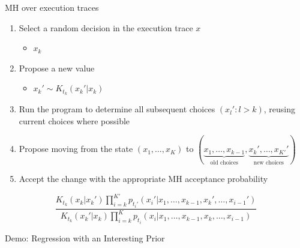 \begin{frame}{MH over execution traces}
  \begin{enumerate}
    \item Select a random decision in the execution trace $x$
    \begin{itemize}
      \item{\eg $x_k$}
    \end{itemize}
    \vspace{\baselineskip}
    \item Propose a new value
    \begin{itemize}
      \item{\eg $x_k' \sim K_{t_k}(x_k'|x_k)$}
    \end{itemize}
    \vspace{\baselineskip}
    \item Run the program to determine all subsequent choices $(x_l' : l > k)$, reusing current choices where possible
    \vspace{\baselineskip}
    \item Propose moving from the state $(x_1,\ldots,x_K)$ to $(\underbrace{x_1,\ldots,x_{k-1}}_{\textrm{old choices}}, \underbrace{x_k',\ldots,x_{K'}'}_{\textrm{new choices}})$
    \vspace{\baselineskip}
    \item Accept the change with the appropriate MH acceptance probability
  \end{enumerate}
  \begin{equation*}
    \frac{K_{t_k}(x_k|x_k')\prod_{i=k}^{K'} p_{t_i'}(x_i'|x_1,\ldots,x_{k-1},x_k',\ldots,x_{i-1}')}{K_{t_k}(x_k'|x_k)\prod_{i=k}^K p_{t_i}(x_i|x_1,\ldots,x_{k-1},x_k,\ldots,x_{i-1})}
  \end{equation*}
\end{frame}


\begin{frame}{Demo: Regression with an Interesting Prior}

\end{frame}

